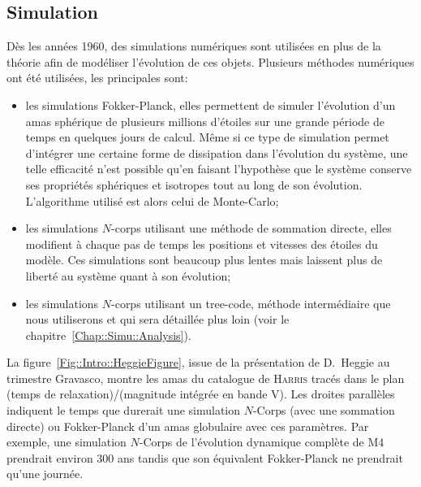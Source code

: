 		\subsection{Simulation}

			Dès les années 1960, des simulations numériques sont utilisées en plus de la théorie afin de modéliser l'évolution de ces
			objets. Plusieurs méthodes numériques ont été utilisées, les principales sont:
			\begin{itemize}

					\item les simulations Fokker-Planck, elles permettent de
						simuler l'évolution d'un amas sphérique de plusieurs millions
						d'étoiles sur une grande période de temps en quelques
						jours de calcul. Même si ce type de simulation permet d'intégrer une
						certaine forme de dissipation dans l'évolution du système, une telle
						efficacité n'est possible qu'en faisant l'hypothèse que le système
						conserve ses propriétés sphériques et isotropes tout au long de son
						évolution. L'algorithme utilisé est alors celui de Monte-Carlo;


					\item les simulations $N$-corps utilisant une méthode de sommation directe, elles modifient à chaque pas de
						temps les positions et vitesses des étoiles du modèle. Ces simulations sont beaucoup plus lentes mais
						laissent plus de liberté au système quant à son évolution;

					\item les simulations $N$-corps utilisant un tree-code, méthode intermédiaire que nous utiliserons et qui sera
						détaillée plus loin (voir le chapitre~\ref{Chap::Simu::Analysis}).

			\end{itemize}
			La figure~\ref{Fig::Intro::HeggieFigure}, issue de la présentation de D.~Heggie au trimestre Gravasco, montre les amas du
			catalogue de \textsc{Harris} tracés dans le plan (temps de relaxation)/(magnitude intégrée en bande V). Les droites parallèles
			indiquent le temps que durerait une simulation $N$-Corps (avec une sommation directe) ou Fokker-Planck d'un amas globulaire avec ces paramètres. Par
			exemple, une simulation $N$-Corps de l'évolution dynamique complète de M4 prendrait environ 300 ans tandis que son équivalent
			Fokker-Planck ne prendrait qu'une journée.


